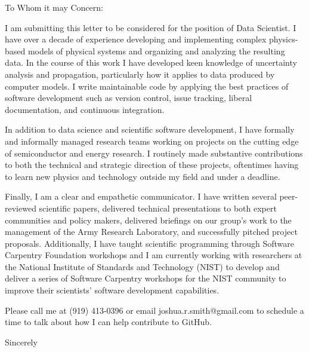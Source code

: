 \documentclass[letterpaper,10pt]{letter}
\begin{document}

\begin{letter}{}

\address{2515 13th St NW\\
         Apt. 510\\
         Washington, DC 20009}

\opening{To Whom it may Concern:}

I am submitting this letter to be considered for the position of Data Scientist.
I have over a decade of experience developing and implementing complex physics-based models of physical systems and organizing and analyzing the resulting data.
In the course of this work I have developed keen knowledge of uncertainty analysis and propagation, particularly how it applies to data produced by computer models.
I write maintainable code by applying the best practices of software development such as version control, issue tracking, liberal documentation, and continuous integration.


In addition to data science and scientific software development, I have formally and informally managed research teams working on projects on the cutting edge of semiconductor and energy research.
I routinely made substantive contributions to both the technical and strategic direction of these projects, oftentimes having to learn new physics and technology outside my field and under a deadline.


Finally, I am a clear and empathetic communicator. 
I have written several peer-reviewed scientific papers, delivered technical presentations to both expert communities and policy makers, delivered briefings on our group's work to the management of the Army Research Laboratory, and successfully pitched project proposals.
Additionally, I have taught scientific programming through Software Carpentry Foundation workshops and I am currently working with researchers at the National Institute of Standards and Technology (NIST) to develop and deliver a series of Software Carpentry workshops for the NIST community to improve their scientists' software development capabilities.


Please call me at (919) 413-0396 or email joshua.r.smith@gmail.com to schedule a time to talk about how I can help contribute to GitHub.


\signature{Joshua Ryan Smith}

\closing{Sincerely}


\end{letter}
\end{document}

